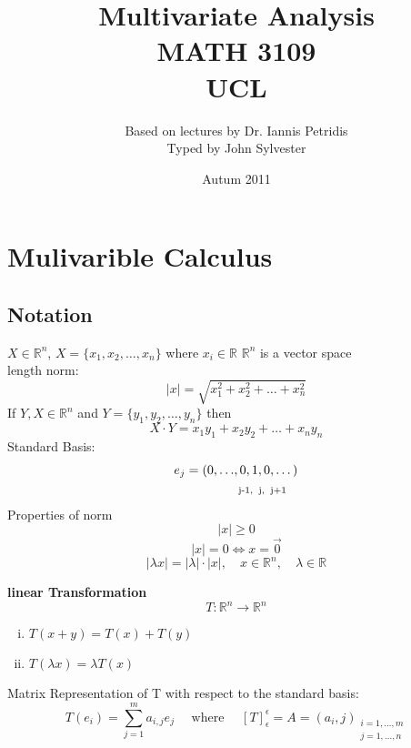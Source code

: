 \documentclass[11pt]{article}
\def\RR{\mathbb{R}}
\begin{document}
\title{Multivariate Analysis\\ MATH 3109\\UCL}
\author{Based on lectures by Dr. Iannis Petridis\\Typed by John Sylvester}
\date{Autum 2011}
\maketitle

\tableofcontents
\setcounter{tocdepth}{4}
\newpage

\section{Mulivarible  Calculus}
\subsection{Notation}
$X\in\RR^{n}$, $ X=\{x_{1},x_{2},\dots,x_{n}\}$ where $x_{i}\in\RR$
$\RR^{n}$ is a vector space\\
length norm:\[|x|=\sqrt{x_1^2 + x_2^2 + \dots +x_n^2 }\]
If $Y,X\in\RR^{n}$ and $ Y=\{y_{1},y_{2},\dots,y_{n}\}$ then \[X \cdot Y=x_{1}y_{1}+ x_{2}y_{2} +\dots + x_{n}y_{n}\]
Standard Basis:
\begin{align*}
  e_j=(0, \dots &,  0, 1, 0, \dots)\\
& \textrm{ \scriptsize j-1,\: j, \:j+1} 
\end{align*}
Properties of norm
\[|x|\geq0\]
\[|x|=0  \Leftrightarrow x=\vec{0}\]
\[| \lambda x| = | \lambda| \cdot |x| , \quad x \in \RR^n, \quad \lambda \in \RR \]

\textbf{linear Transformation}
\[T:\RR^{n}\rightarrow\RR^{n}\]
\begin{enumerate}[(i)]
\item $ T(x+y)=T(x) + T(y)$
\item $T(\lambda x) =\lambda T(x) $
\end{enumerate}
Matrix Representation of T with respect to the standard basis:\\
\[T(e_i)=\sum_{j=1}^{m}a_{i,j}e_j \quad\textrm{ where }\quad [T]_{\epsilon}^{\epsilon}=A=(a_i,j)_{\substack{i=1,\dots ,m \\ j=1,\dots ,n}}\]
\end{document}
